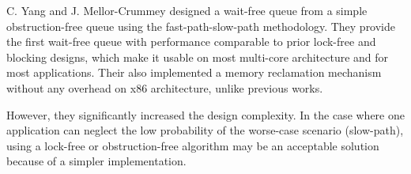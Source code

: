 C. Yang and J. Mellor-Crummey designed a wait-free queue from a simple
obstruction-free queue using the fast-path-slow-path methodology. They provide
the first wait-free queue with performance comparable to prior lock-free and
blocking designs, which make it usable on most multi-core architecture and for
most applications. Their also implemented a memory reclamation mechanism without
any overhead on x86 architecture, unlike previous works.

However, they significantly increased the design complexity. In the case where
one application can neglect the low probability of the worse-case scenario
(slow-path), using a lock-free or obstruction-free algorithm may be an
acceptable solution because of a simpler implementation.

